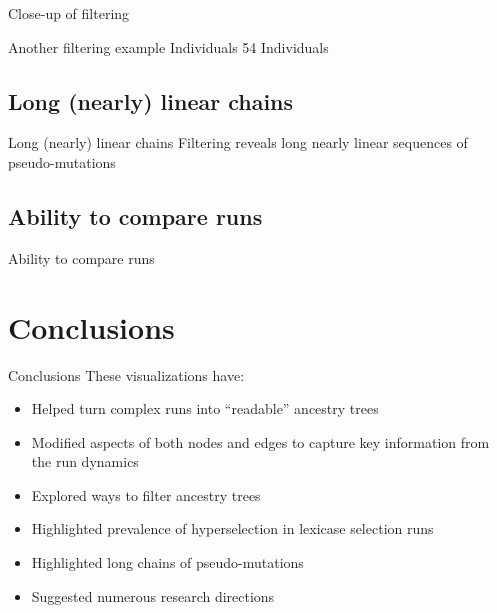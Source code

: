 \documentclass{beamer}
\begin{document}
\begin{frame}{Close-up of filtering}
\end{frame}
 
\begin{frame}{Another filtering example}
 Individuals \hspace{4.5cm} 54 Individuals \\
\end{frame}

\subsection{Long (nearly) linear chains}
\begin{frame}{Long (nearly) linear chains}
Filtering reveals long nearly linear sequences of pseudo-mutations
\end{frame}

\subsection{Ability to compare runs}

\begin{frame}{Ability to compare runs}
\begin{center}
\end{center}
\end{frame}

\section{Conclusions}
\begin{frame}{Conclusions}
These visualizations have:
\begin{itemize}
\item Helped turn complex runs into ``readable'' ancestry trees
\item Modified aspects of both nodes and edges to capture key information from the run dynamics
\item Explored ways to filter ancestry trees
\item Highlighted prevalence of hyperselection in lexicase selection runs
\item Highlighted long chains of pseudo-mutations
\item Suggested numerous research directions
\end{itemize}
\end{frame}
\end{document}
